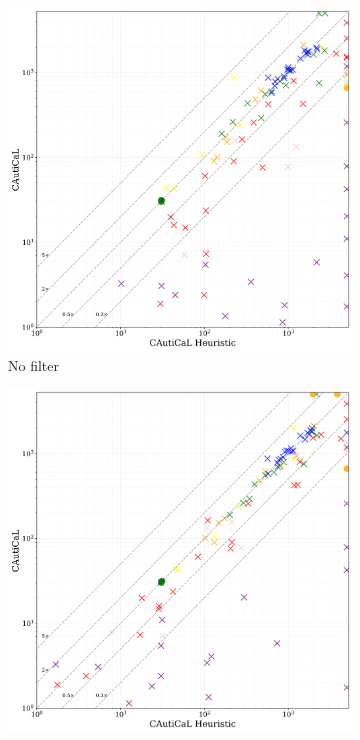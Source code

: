 \begin{figure}[!t]
    \centering
    \begin{subfigure}[t]{0.3\textwidth}
        \centering
        \includegraphics[width=\textwidth]{figs/globaldontfilter_heuristic_comparison.jpg}
        \caption{No filter}
        \label{fig:globaldontfilter}
    \end{subfigure}
    \begin{subfigure}[t]{0.3\textwidth}
        \centering
        \includegraphics[width=\textwidth]{figs/globalmaxlen_heuristic_comparison.jpg}

\end{subfigure}
\end{figure}
